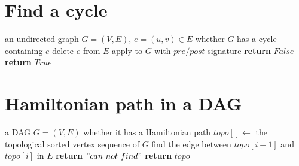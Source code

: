 \documentclass[a4paper]{article}
\begin{document}
\begin{spacing}{1.3}
\section*{Find a cycle}
\begin{algorithmic}[1]
\Require an undirected graph $G=(V,E)$, $e=(u,v)\in E$
\Ensure whether $G$ has a cycle containing $e$
\State delete $e$ from $E$
\State apply  to $G$ with $pre/post$ signature
 
\State \textbf{return} $False$
\Else
\State \textbf{return} $True$
\EndIf
\end{algorithmic}

\section*{Hamiltonian path in a DAG}
\begin{algorithmic}[1]
\Require a DAG $G=(V,E)$
\Ensure whether it has a Hamiltonian path
\State $topo[]\gets$ the topological sorted vertex sequence of $G$
\State find the edge between $topo[i-1]$ and $topo[i]$ in $E$
 
\State \textbf{return} $"can\ not\ find"$
\EndIf
\EndFor
\State \textbf{return} $topo$ 
\end{algorithmic}
\end{spacing}
\end{document}
